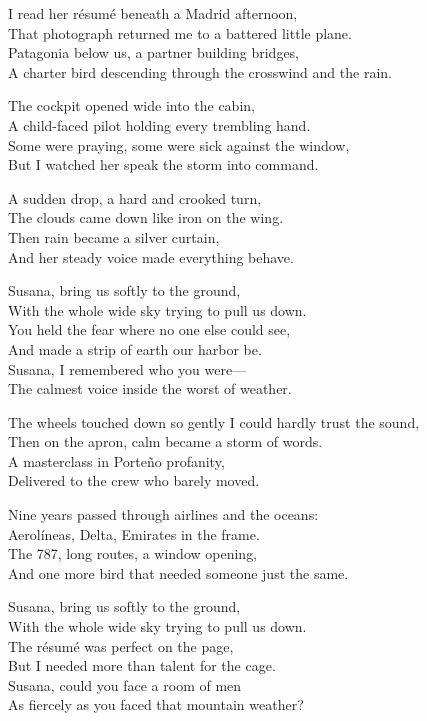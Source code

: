 \begin{lyrics}
I read her résumé beneath a Madrid afternoon,\\
That photograph returned me to a battered little plane.\\
Patagonia below us, a partner building bridges,\\
A charter bird descending through the crosswind and the rain.

The cockpit opened wide into the cabin,\\
A child-faced pilot holding every trembling hand.\\
Some were praying, some were sick against the window,\\
But I watched her speak the storm into command.

A sudden drop, a hard and crooked turn,\\
The clouds came down like iron on the wing.\\
Then rain became a silver curtain,\\
And her steady voice made everything behave.

Susana, bring us softly to the ground,\\
With the whole wide sky trying to pull us down.\\
You held the fear where no one else could see,\\
And made a strip of earth our harbor be.\\
Susana, I remembered who you were—\\
The calmest voice inside the worst of weather.

The wheels touched down so gently I could hardly trust the sound,\\
Then on the apron, calm became a storm of words.\\
A masterclass in Porteño profanity,\\
Delivered to the crew who barely moved.

Nine years passed through airlines and the oceans:\\
Aerolíneas, Delta, Emirates in the frame.\\
The 787, long routes, a window opening,\\
And one more bird that needed someone just the same.

Susana, bring us softly to the ground,\\
With the whole wide sky trying to pull us down.\\
The résumé was perfect on the page,\\
But I needed more than talent for the cage.\\
Susana, could you face a room of men\\
As fiercely as you faced that mountain weather?


\end{lyrics}

